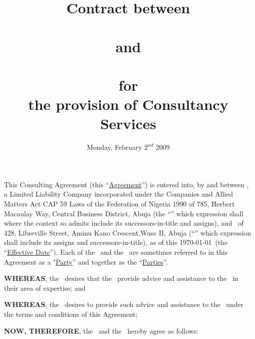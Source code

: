 \documentclass[a4paper,10pt,notitlepage,twocolumn]{article}
\date{Monday, February $2^{nd}$ 2009}
\author{}
\title{Contract between 
\\ \textbf{\clname}
 \\ and 
\\ \textbf{\cntrname}
 \\ for 
\\ the provision of Consultancy Services }
\begin{document}
\maketitle


\pagebreak

This Consulting Agreement (this ``\underline{Agreement}'') is entered into, by and between \clname,  a Limited Liability Company incorporated under the Companies and Allied Matters Act CAP 59 Laws of the Federation of Nigeria 1990 of 785, Herbert Macaulay Way, Central Business District, Abuja (the ``\underline{\clref}'' which expression shall where the context so admits include its successors-in-title and assigns), and \cntrname\ of 428, Libreville Street, Aminu Kano Crescent,Wuse II, Abuja (``\underline{\cntrref}'' which expression shall include its assigns and successors-in-title), as of this \today\  (the ``\underline{Effective Date}'').  Each of the \clref\ and the \cntrref\ are sometimes referred to in this Agreement as a "\underline{Party}'' and together as the ``\underline{Parties}''.

\medskip
\textbf{WHEREAS}, the \clref\ desires that the \cntrref\ provide advice and assistance to the \clref\ in their area of expertise; and

\medskip
\textbf{WHEREAS}, the \cntrref\ desires to provide such advice and assistance to the \clref\ under the terms and conditions of this Agreement;

\medskip
\textbf{NOW, THEREFORE}, the \clref\ and the \cntrref\ hereby agree as follows:
\end{document}
